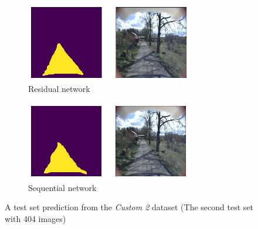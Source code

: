 \documentclass[USenglish]{ifimaster}  %
\begin{document}
\begin{figure}[H]
\centering
\begin{subfigure}[b]{\textwidth}
\centering
\includegraphics[width=0.8\textwidth]{bilder/custom_2_exclusive/1938_res.png}
\caption{Residual network}
\label{fig:custom_2_2_res}
\end{subfigure}
\hfill
\begin{subfigure}[b]{\textwidth}
\centering
\includegraphics[width=0.8\textwidth]{bilder/custom_2_exclusive/1938_seq.png}
\caption{Sequential network}
\label{fig:custom_2_2_seq}
\end{subfigure}
\caption{A test set prediction from the \textit{Custom 2} dataset (The second test set with 404 images)}
\end{figure}
\end{document}
